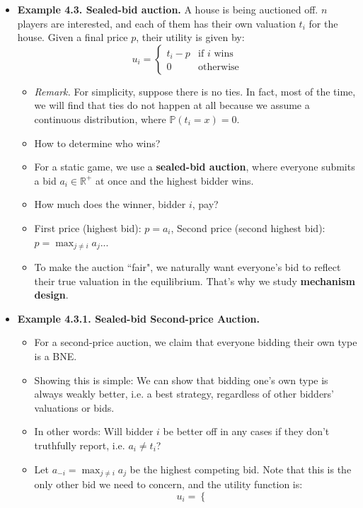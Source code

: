 \documentclass[notitlepage]{article}
\begin{document}
\begin{itemize}
    \item \textbf{Example 4.3. Sealed-bid auction.} A house is being auctioned off. \(n\) players are interested, and each of them has their own valuation \(t_i\) for the house. Given a final price \(p\), their utility is given by:
    \[
    u_i = 
    \begin{cases}
        t_i-p & \text{if } i \text{ wins} \\
        0 & \text{otherwise}
    \end{cases}
    \]
    \begin{itemize}
        \item \textit{Remark.} For simplicity, suppose there is no ties. In fact, most of the time, we will find that ties do not happen at all because we assume a continuous distribution, where \(\mathbb{P}(t_i=x)=0\).
        \item How to determine who wins?
        \item For a static game, we use a \textbf{sealed-bid auction}, where everyone submits a bid \(a_i \in \mathbb{R}^+\) at once and the highest bidder wins.
        \item How much does the winner, bidder \(i\), pay?
        \item First price (highest bid): \(p=a_i\), Second price (second highest bid): \(p=\max_{j\ne i}a_j\)...
        \item To make the auction ``fair", we naturally want everyone's bid to reflect their true valuation in the equilibrium. That's why we study \textbf{mechanism design}.
    \end{itemize}
    \item \textbf{Example 4.3.1. Sealed-bid Second-price Auction.}
    \begin{itemize}
        \item For a second-price auction, we claim that everyone bidding their own type is a BNE.
        \item Showing this is simple: We can show that bidding one's own type is always weakly better, i.e. a best strategy, regardless of other bidders' valuations or bids.
        \item In other words: Will bidder \(i\) be better off in any cases if they don't truthfully report, i.e. \(a_i \ne t_i\)?
        \item Let \(a_{-i} = \max_{j\ne i}a_j\) be the highest competing bid. Note that this is the only other bid we need to concern, and the utility function is:
        \[
        u_i = 
        \begin{cases}

\end{cases}\]
\end{itemize}
\end{itemize}
\end{document}
